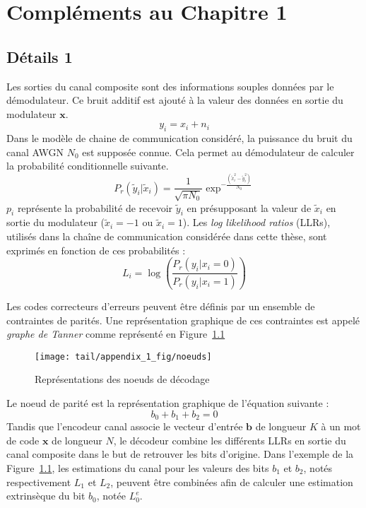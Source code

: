 
\appendix

\chapter{Compléments au Chapitre 1}
\section{Détails 1}\label{append:decoding_nodes}

Les sorties du canal composite sont des informations souples données par le démodulateur.
Ce bruit additif est ajouté à la valeur des données en sortie du modulateur $\mathbold{x}$.
\begin{equation}
y_i = x_i + n_i
\end{equation}
Dans le modèle de chaine de communication considéré, la puissance du bruit du canal AWGN $N_0$ est supposée connue.
Cela permet au démodulateur de calculer la probabilité conditionnelle suivante.
\begin{equation}
	P_r( \tilde{y}_i|\tilde{x}_i) = \dfrac{1}{\sqrt{\pi N_0}}\exp^{-\tfrac{(\tilde{x}_i^2-\tilde{y}_i^2)}{N_0}}
\end{equation}
$p_i$ représente la probabilité de recevoir $\tilde{y}_i$ en présupposant la valeur de $\tilde{x}_i$ en sortie du modulateur ($\tilde{x}_i=-1$ ou $\tilde{x}_i=1$). Les \textit{log likelihood ratios} (LLRs), utilisés dans la chaîne de communication considérée dans cette thèse, sont exprimés en fonction de ces probabilités :
\begin{equation}
	L_i = \log\left(\dfrac{P_r(y_i | x_i = 0)}{P_r(y_i | x_i = 1)}\right)
\end{equation}
  \label{eq:lr}

Les codes correcteurs d'erreurs peuvent être définis par un ensemble de contraintes de parités. Une représentation graphique de ces contraintes est appelé \textit{graphe de Tanner} comme représenté en Figure~\ref{fig:noeuds}

\begin{figure}[t]
\centering
\texttt{[image: tail/appendix\_1\_fig/noeuds]}
\caption{Représentations des noeuds de décodage}
\label{fig:noeuds}
\end{figure}

Le noeud de parité est la représentation graphique de l'équation suivante : 
\begin{equation}
b_0 + b_1 + b_2 = 0
\end{equation}
Tandis que l'encodeur canal associe le vecteur d'entrée $\mathbold{b}$ de longueur $K$ à un mot de code $\mathbold{x}$ de longueur $N$, le décodeur combine les différents LLRs en sortie du canal composite dans le but de retrouver les bits d'origine.
Dans l'exemple de la Figure~\ref{fig:noeuds}, les estimations du canal pour les valeurs des bits $b_1$ et $b_2$, notés respectivement $L_1$ et $L_2$, peuvent être combinées afin de calculer une estimation extrinsèque du bit $b_0$, notée $L_0^e$.

